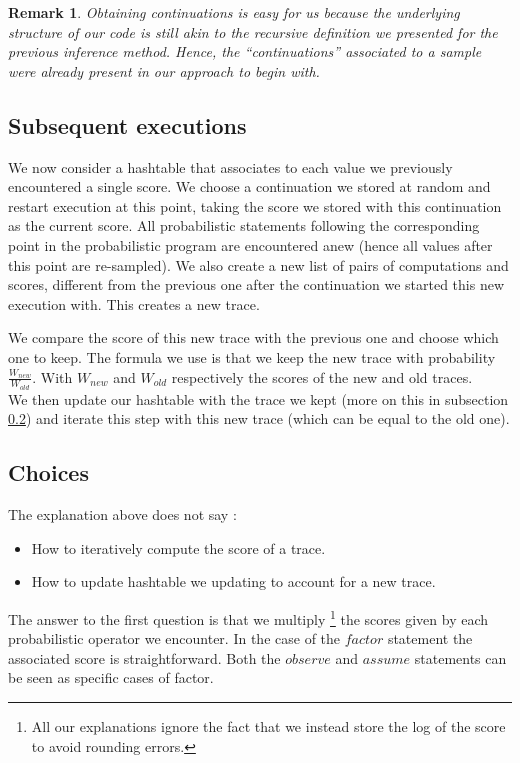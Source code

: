 \documentclass{article}
\newtheorem{remark}{Remark}
\begin{document}
	\begin{remark}
	  Obtaining continuations is easy for us because the underlying structure of our code is still akin to the recursive definition we presented for the previous inference method.
	  Hence, the ``continuations'' associated to a sample were already present in our approach to begin with.
	\end{remark}

	\subsection{Subsequent executions}

	We now consider a hashtable that associates to each value we previously encountered a single score. 
	We choose a continuation we stored at random and restart execution at this point, taking the score we stored with this continuation as the current score. 
	All probabilistic statements following the corresponding point in the probabilistic program are encountered anew (hence all values after this point are re-sampled).
	We also create a new list of pairs of computations and scores, different from the previous one after the continuation we started this new execution with.
	This creates a new trace.

	We compare the score of this new trace with the previous one and choose which one to keep.
	The formula we use is that we keep the new trace with probability $\frac{W_{new}}{W_{old}}$. 
	With $W_{new}$ and $W_{old}$ respectively the scores of the new and old traces. \\

	We then update our hashtable with the trace we kept (more on this in subsection \ref{subseq:choice}) and iterate this step with this new trace (which can be equal to the old one).

	\subsection{Choices}
	\label{subseq:choice}

	The explanation above does not say :
	\begin{itemize}
	  \item How to iteratively compute the score of a trace.
	  \item How to update hashtable we updating to account for a new trace.
	\end{itemize}

	The answer to the first question is that we multiply 
	\footnote{All our explanations ignore the fact that we instead store the log of the score to avoid rounding errors.}
	the scores given by each probabilistic operator we encounter.
	In the case of the $factor$ statement the associated score is straightforward. 
	Both the $observe$ and $assume$ statements can be seen as specific cases of factor.
\end{document}
